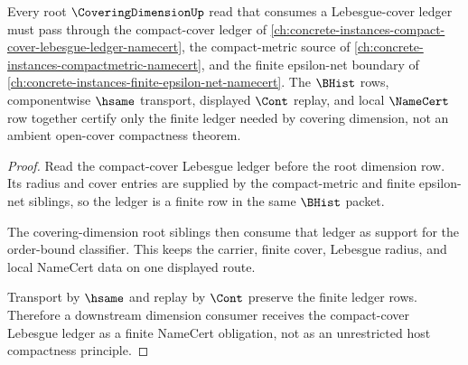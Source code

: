 \begin{theorem}
\label{thm:coveringdimension-root-lebesgue-ledger-obligation}
Every root $\CoveringDimensionUp$ read that consumes a Lebesgue-cover ledger must pass through the compact-cover ledger of \autoref{ch:concrete-instances-compact-cover-lebesgue-ledger-namecert}, the compact-metric source of \autoref{ch:concrete-instances-compactmetric-namecert}, and the finite epsilon-net boundary of \autoref{ch:concrete-instances-finite-epsilon-net-namecert}. The $\BHist$ rows, componentwise $\hsame$ transport, displayed $\Cont$ replay, and local $\NameCert$ row together certify only the finite ledger needed by covering dimension, not an ambient open-cover compactness theorem.
\end{theorem}
\begin{proof}
Read the compact-cover Lebesgue ledger before the root dimension row. Its radius and cover entries are supplied by the compact-metric and finite epsilon-net siblings, so the ledger is a finite row in the same $\BHist$ packet.

The covering-dimension root siblings then consume that ledger as support for the order-bound classifier. This keeps the carrier, finite cover, Lebesgue radius, and local NameCert data on one displayed route.

Transport by $\hsame$ and replay by $\Cont$ preserve the finite ledger rows. Therefore a downstream dimension consumer receives the compact-cover Lebesgue ledger as a finite NameCert obligation, not as an unrestricted host compactness principle.
\end{proof}

